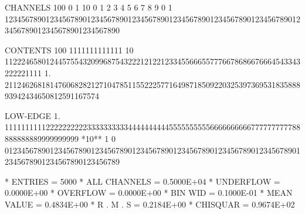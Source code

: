 \begin{Listing}
 CHANNELS 100   0                                                                                                  1   
           10   0        1         2         3         4         5         6         7         8         9         0   
            1   1234567890123456789012345678901234567890123456789012345678901234567890123456789012345678901234567890   
 
 CONTENTS 100                          1111111111111                                                                
           10                 112224658012445755432099687543222121221233455666557776678686676664543343222221111     
            1.       21124626818147606828212710478511552225771649871850922032539736953183588893942434650812591167574
 
 LOW-EDGE   1.            111111111122222222223333333333444444444455555555556666666666777777777788888888889999999999
 *10**  1   0   0123456789012345678901234567890123456789012345678901234567890123456789012345678901234567890123456789
 
 * ENTRIES =       5000      * ALL CHANNELS = 0.5000E+04      * UNDERFLOW = 0.0000E+00      * OVERFLOW = 0.0000E+00
 * BIN WID = 0.1000E-01      * MEAN VALUE   = 0.4834E+00      * R . M . S = 0.2184E+00
 * CHISQUAR  =  0.9674E+02
\end{Listing}

\endinput

 
 
\section{Fitting with finite Monte Carlo statistics}
\index{maximum likelihood}
\index{likelihood}
\index{test!Monte Carlo distribitions}
 
The following three routines are intended to help with problems of the 
type: 
\begin{quote}
``Given a data distribution, and a set of Monte Carlo distributions,
what is the best estimate of the fraction of each Monte Carlo distribution
present in the data distribution?.''
\end{quote}
An example is the determination of
the proportions of different sources (direct b decay, cascade b decays,
c decays, background) contributing to the spectrum of
inclusive leptons in Z decay events).
 
The maximum likelihood method is used,
the likelihood function being calculated including the effect of both data and
Monte Carlo statistics, as described in ~\cite{bib-FINITEMC}.  
Subroutine
\Rind{HMCMLL} uses \MINUIT{} to perform the log-likelihood maximisation and 
return a set of fractions.  
Functions \Rind{HMCINI} and \Rind{HMCLNL} are 
provided for those who wish to perform the fit themselves. 
 
